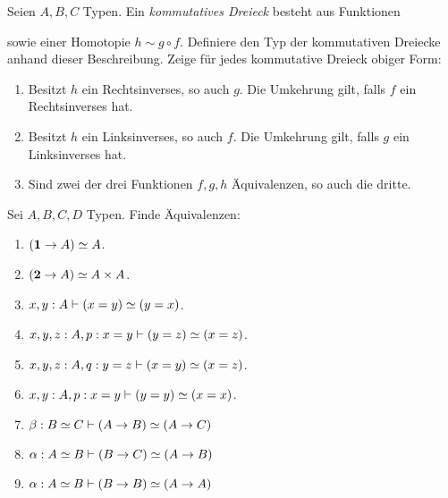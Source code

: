 \documentclass{uebung}
\begin{document}

\begin{exercise}
  Seien $A,B,C$ Typen.
  Ein \emph{kommutatives Dreieck} besteht aus Funktionen
  \begin{center}
  \end{center}
  sowie einer Homotopie $h\sim g\circ f$.
  Definiere den Typ der kommutativen Dreiecke anhand dieser Beschreibung.
  Zeige für jedes kommutative Dreieck obiger Form:
  \begin{enumerate}
    \item Besitzt $h$ ein Rechtsinverses, so auch $g$.
      Die Umkehrung gilt, falls $f$ ein Rechtsinverses hat.
    \item Besitzt $h$ ein Linksinverses, so auch $f$.
      Die Umkehrung gilt, falls $g$ ein Linksinverses hat.
    \item Sind zwei der drei Funktionen $f,g,h$ Äquivalenzen, so auch die dritte.
  \end{enumerate}
\end{exercise}

\begin{exercise}[Äquivalenzen]
  Sei $A,B,C,D$ Typen.
  Finde Äquivalenzen:
  \begin{multicols}{2}
    \begin{enumerate}
      \item $(\mathbf{1} \to A)\simeq A$.
      \item $(\mathbf{2} \to A)\simeq A\times A$. 
      \item $x,y:A \vdash (x=y) \simeq (y=x)$.
      \item $x,y,z:A,p:x=y \vdash (y=z) \simeq (x=z)$.
      \item $x,y,z:A,q:y=z \vdash (x=y) \simeq (x=z)$.
      \item $x,y:A,p:x=y \vdash (y=y) \simeq (x=x)$.
      \item $\beta:B\simeq C\vdash (A\to B) \simeq (A\to C)$
      \item $\alpha:A\simeq B\vdash (B\to C) \simeq (A\to B)$
      \item $\alpha:A\simeq B\vdash (B\to B) \simeq (A\to A)$
    \end{enumerate}
  \end{multicols}
\end{exercise}
\end{document}

